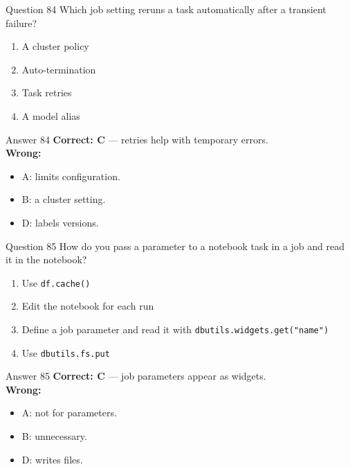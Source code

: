 \documentclass[aspectratio=169,11pt]{beamer}
\begin{document}
\begin{frame}{Question 84}
Which job setting reruns a task automatically after a transient failure?
\begin{enumerate}[label=\Alph*.]
\item A cluster policy
\item Auto-termination
\item Task retries
\item A model alias
\end{enumerate}
\end{frame}
\begin{frame}{Answer 84}
\textbf{Correct: C} --- retries help with temporary errors.\\
\vspace{0.5em}
\textbf{Wrong:}
\begin{itemize}
\item A: limits configuration.
\item B: a cluster setting.
\item D: labels versions.
\end{itemize}
\end{frame}

\begin{frame}{Question 85}
How do you pass a parameter to a notebook task in a job and read it in the notebook?
\begin{enumerate}[label=\Alph*.]
\item Use \texttt{df.cache()}
\item Edit the notebook for each run
\item Define a job parameter and read it with \texttt{dbutils.widgets.get("name")}
\item Use \texttt{dbutils.fs.put}
\end{enumerate}
\end{frame}
\begin{frame}{Answer 85}
\textbf{Correct: C} --- job parameters appear as widgets.\\
\vspace{0.5em}
\textbf{Wrong:}
\begin{itemize}
\item A: not for parameters.
\item B: unnecessary.
\item D: writes files.
\end{itemize}
\end{frame}
\end{document}
